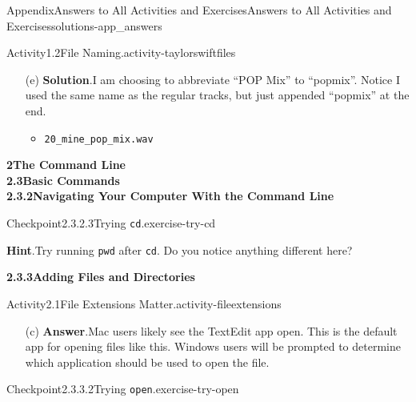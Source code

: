 \documentclass[oneside,10pt,]{book}
\newcommand{\blocktitlefont}{\relax}
\newcommand{\mono}[1]{\texttt{#1}}
\begin{document}
\begin{solutions-chapter}{Appendix}{Answers to All Activities and Exercises}{}{Answers to All Activities and Exercises}{}{}{solutions-app_answers}
\begin{activitysolution}{Activity}{1.2}{File Naming.}{activity-taylorswiftfiles}
\begin{enumerate}[font=\bfseries,label=(\alph*),ref=\alph*]
\begin{itemize}[label=\textbullet]
\item{}\mono{18\_back\_to\_dec\_acoust.wav}%
\item{}\mono{19\_haunted\_acoust.wav}%
\end{itemize}
%
\item[(e)]\noindent\textbf{\blocktitlefont Solution}.\hypertarget{solution-taylorswiftfiles-h-b-back}{}\quad{}I am choosing to abbreviate ``POP Mix'' to ``pop\textunderscore{}mix''. Notice I used the same name as the regular tracks, but just appended ``\textunderscore{}pop\textunderscore{}mix'' at the end.%
\begin{itemize}[label=\textbullet]
\item{}\mono{20\_mine\_pop\_mix.wav}%
\end{itemize}
%
\end{enumerate}%
\end{activitysolution}%
\par\medskip
\noindent\textbf{\Large{}2\space\textperiodcentered\space{}The Command Line\\
2.3\space\textperiodcentered\space{}Basic Commands\\
2.3.2\space\textperiodcentered\space{}Navigating Your Computer With the Command Line}
\begin{inlinesolution}{Checkpoint}{2.3.2.3}{Trying \mono{cd}.}{exercise-try-cd}%
\par\smallskip%
\noindent\textbf{\blocktitlefont Hint}.\hypertarget{hint-try-cd-c-back}{}\quad{}Try running \mono{pwd} after \mono{cd}. Do you notice anything different here?%
\end{inlinesolution}%
\par\medskip
\noindent\textbf{\Large{}2.3.3\space\textperiodcentered\space{}Adding Files and Directories}
\begin{activitysolution}{Activity}{2.1}{File Extensions Matter.}{activity-fileextensions}%
\begin{enumerate}[font=\bfseries,label=(\alph*),ref=\alph*]%
\item[(c)]\noindent\textbf{\blocktitlefont Answer}.\hypertarget{answer-fileextensions-g-b-back}{}\quad{}Mac users likely see the TextEdit app open. This is the default app for opening files like this. Windows users will be prompted to determine which application should be used to open the file.%
\end{enumerate}%
\end{activitysolution}%
\begin{inlinesolution}{Checkpoint}{2.3.3.2}{Trying \mono{open}.}{exercise-try-open}%

\end{inlinesolution}
\end{solutions-chapter}
\end{document}
